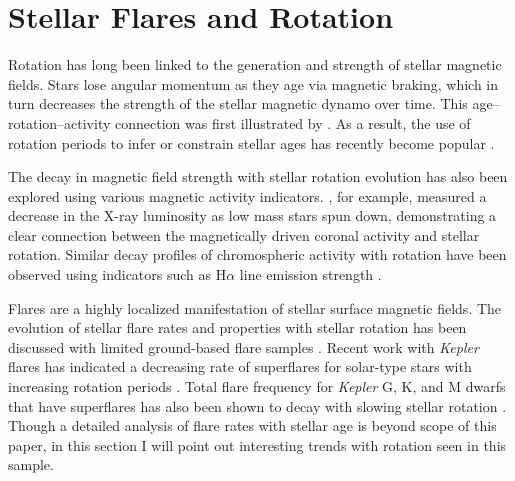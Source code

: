 \documentclass[twocolumn]{aastex6}
\newcommand{\Kepler}{\textsl{Kepler}\xspace}
\begin{document}
\section{Stellar Flares and Rotation}

Rotation has long been linked to the generation and strength of stellar magnetic fields. Stars lose angular momentum as they age via magnetic braking, which in turn decreases the strength of the stellar magnetic dynamo over time. This age--rotation--activity connection was first illustrated by \citet{skumanich1972}. As a result, the use of rotation periods to infer or constrain stellar ages has recently become popular \citep[e.g.][]{barnes2007,mamajek2008,van-saders2016}.

The decay in magnetic field strength with stellar rotation evolution has also been explored using various magnetic activity indicators. \citet{wright2011}, for example, measured a decrease in the X-ray luminosity as low mass stars spun down, demonstrating a clear connection between the magnetically driven coronal activity and stellar rotation. Similar decay profiles of chromospheric activity with rotation have been observed using indicators such as H$\alpha$ line emission strength \citep{douglas2014}. 

Flares are a highly localized manifestation of stellar surface magnetic fields. The evolution of stellar flare rates and properties with stellar rotation has been discussed with limited ground-based flare samples \citep{skumanich1986}. Recent work with \Kepler flares has indicated a decreasing rate of superflares for solar-type stars with increasing rotation periods \citep{maehara2015}. Total flare frequency for \Kepler G, K, and M dwarfs that have superflares has also been shown to decay with slowing stellar rotation \citep{candelaresi2014}. 
Though a detailed analysis of flare rates with stellar age is beyond scope of this paper, in this section I will point out interesting trends with rotation seen in this sample.
\end{document}
